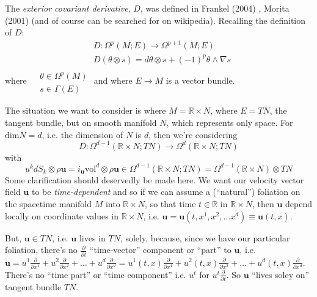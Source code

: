 \documentclass[twoside,landscape,10pt]{amsart}
\theoremstyle{plain}
\theoremstyle{definition}
\theoremstyle{remark}
\theoremstyle{remark}
\begin{document}
\begin{multicols*}{2}
The \emph{exterior covariant derivative}, $D$, was defined in Frankel (2004) \cite{TFrankel2004}, Morita (2001) \cite{SMorita2001} (and of course can be searched for on wikipedia).  Recalling the definition of $D$:
\begin{equation}\label{Def:exteriorcovariantderivative}
\begin{aligned}
  &  D:\Omega^p(M;E)\to \Omega^{p+1}(M;E) \\ 
  &  D(\theta \otimes s) = d\theta \otimes s + (-1)^p \theta \wedge \nabla s
\end{aligned}
\end{equation}
where $\begin{aligned} & \quad \\
  & \theta \in \Omega^p(M) \\
  & s \in \Gamma(E) \end{aligned}$ and where $E \to M$ is a vector bundle.  

The situation we want to consider is where $M = \mathbb{R}\times N$, where $E=TN$, the tangent bundle, but on smooth manifold $N$, which represents only space.  For $\text{dim}N = d$, i.e. the dimension of $N$ is $d$, then we're considering
\[
D: \Omega^{d-1}(\mathbb{R} \times N ; TN) \to \Omega^d(\mathbb{R}\times N;TN)
\]  
with 
\[
u^k dS_k \otimes \rho \mathbf{u} = i_{\mathbf{u}} \text{vol}^d \otimes \rho \mathbf{u} \in \Omega^{d-1}(\mathbb{R} \times N; TN) = \Omega^{d-1}(\mathbb{R} \times N) \otimes TN
\]
Some clarification should deservedly be made here. We want our velocity vector field $\mathbf{u}$ to be \emph{time-dependent} and so if we can assume a (``natural'') foliation on the spacetime manifold $M$ into $\mathbb{R} \times N$, so that time $t\in \mathbb{R}$ in $\mathbb{R} \times N$, then $\mathbf{u}$ depend locally on coordinate values in $\mathbb{R}\times N$, i.e. $\mathbf{u} = \mathbf{u}(t,x^1,x^2, \dots x^d) \equiv \mathbf{u}(t,x)$.  

But, $\mathbf{u} \in TN$, i.e. $\mathbf{u}$ lives in $TN$, solely, because, since we have our particular foliation, there's no $\frac{ \partial }{ \partial t}$ ``time-vector'' component or ``part'' to $\mathbf{u}$, i.e. $\mathbf{u} = u^1 \frac{ \partial }{ \partial x^1} + u^2 \frac{ \partial }{ \partial x^2} + \dots + u^d \frac{ \partial }{ \partial x^d} = u^1(t,x) \frac{ \partial }{ \partial x^1} + u^2(t,x) \frac{ \partial }{ \partial x^2} + \dots + u^d(t,x) \frac{ \partial }{ \partial x^d}$.  There's no ``time part'' or ``time component'' i.e. $u^t$ for $u^t \frac{ \partial }{ \partial t}$.  So $\mathbf{u}$ ``lives soley on'' tangent bundle $TN$.    


\end{multicols*}
\end{document}
